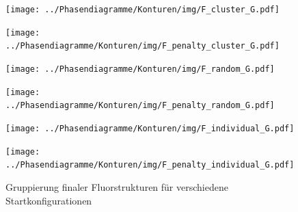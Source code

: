 \documentclass[a4paper, 10pt, twoside, openany]{book} %
\begin{document}
	\begin{figure}
		\begin{minipage}[t]{0.48\textwidth}
			\texttt{[image: ../Phasendiagramme/Konturen/img/F\_cluster\_G.pdf]}
			\label{F_cluster_G}
		\end{minipage}
		\hfill
		\begin{minipage}[t]{0.48\textwidth}
			\texttt{[image: ../Phasendiagramme/Konturen/img/F\_penalty\_cluster\_G.pdf]}
			\label{F_penalty_cluster_G}
		\end{minipage}
		\begin{minipage}[t]{0.48\textwidth}
			\texttt{[image: ../Phasendiagramme/Konturen/img/F\_random\_G.pdf]}
			\label{F_random_G}
		\end{minipage}
		\hfill
		\begin{minipage}[t]{0.48\textwidth}
			\texttt{[image: ../Phasendiagramme/Konturen/img/F\_penalty\_random\_G.pdf]}
			\label{F_penalty_random_G}
		\end{minipage}
		\begin{minipage}[t]{0.48\textwidth}
			\texttt{[image: ../Phasendiagramme/Konturen/img/F\_individual\_G.pdf]}
			\label{F_individual_G}
		\end{minipage}
		\hfill
		\begin{minipage}[t]{0.48\textwidth}
			\texttt{[image: ../Phasendiagramme/Konturen/img/F\_penalty\_individual\_G.pdf]}
			\label{F_penalty_individual_G}
		\end{minipage}
		\caption[Gruppierung finaler Fluorstrukturen]{Gruppierung finaler Fluorstrukturen für verschiedene Startkonfigurationen}
		\label{F_G}
	\end{figure}
	
\end{document}
